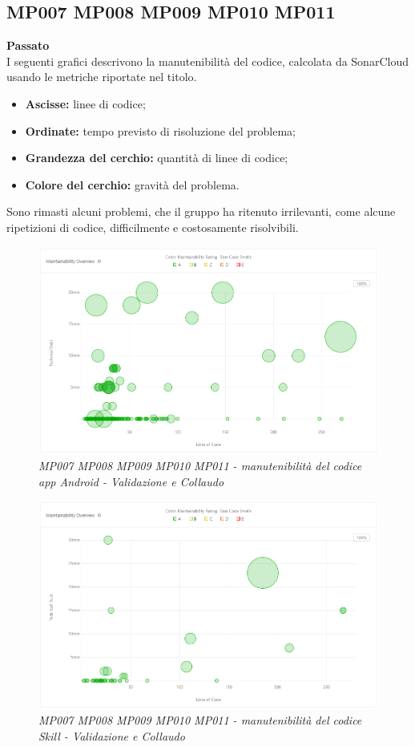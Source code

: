 \subsection{MP007 MP008 MP009 MP010 MP011 }
\textbf{Passato}\\
I seguenti grafici descrivono la manutenibilità del codice, calcolata da SonarCloud usando le metriche riportate nel titolo.\\
\begin{itemize}
	\item \textbf{Ascisse:} linee di codice;
	\item \textbf{Ordinate:} tempo previsto di risoluzione del problema;
	\item \textbf{Grandezza del cerchio:} quantità di linee di codice;
	\item \textbf{Colore del cerchio:} gravità del problema.
\end{itemize}
Sono rimasti alcuni problemi, che il gruppo ha ritenuto irrilevanti, come alcune ripetizioni di codice, difficilmente e costosamente risolvibili. 
\begin{figure} [H]
    \centering
	\includegraphics[scale=0.5]{./images/RA_app_sonar.png}
    \caption{\textit{MP007 MP008 MP009 MP010 MP011 - manutenibilità del codice app Android - Validazione e Collaudo}}\label{}
\end{figure}
\begin{figure} [H]
    \centering
	\includegraphics[scale=0.5]{./images/RA_skill_sonar.png}
    \caption{\textit{MP007 MP008 MP009 MP010 MP011 - manutenibilità del codice Skill - Validazione e Collaudo}}\label{}
\end{figure}

